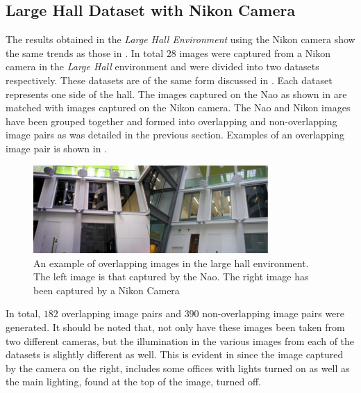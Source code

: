 \documentclass[11pt]{report}
\begin{document}
\subsection{Large Hall Dataset with Nikon Camera}
\label{sec:nikonlargeHall}
The results obtained in the \textit{Large Hall Environment} using the Nikon camera show the same trends as those in . In total $28$ images were captured from a Nikon camera in the \textit{Large Hall} environment and were divided into two datasets respectively. These datasets are of the same form discussed in . Each dataset represents one side of the hall. The images captured on the Nao as shown in  are matched with images captured on the Nikon camera. The Nao and Nikon images have been grouped together and formed into overlapping and non-overlapping image pairs as was detailed in the previous section. Examples of an overlapping image pair is shown in .\\

\begin{figure}[h!] 
  \centering
    \includegraphics[width=0.8\textwidth]{../Drawings/camera/comparelargeHall.jpg}
    \caption{An example of overlapping images in the large hall environment. The left image is that captured by the Nao. The right image has been captured by a Nikon Camera}
    \label{fig:cameraOverlaplargeHall}
\end{figure}

In total, $182$ overlapping image pairs and $390$ non-overlapping image pairs were generated. It should be noted that, not only have these images been taken from two different cameras, but the illumination in the various images from each of the datasets is slightly different as well. This is evident in   since the image captured by the camera on the right, includes some offices with lights turned on as well as the main lighting, found at the top of the image, turned off. \\
\end{document}
